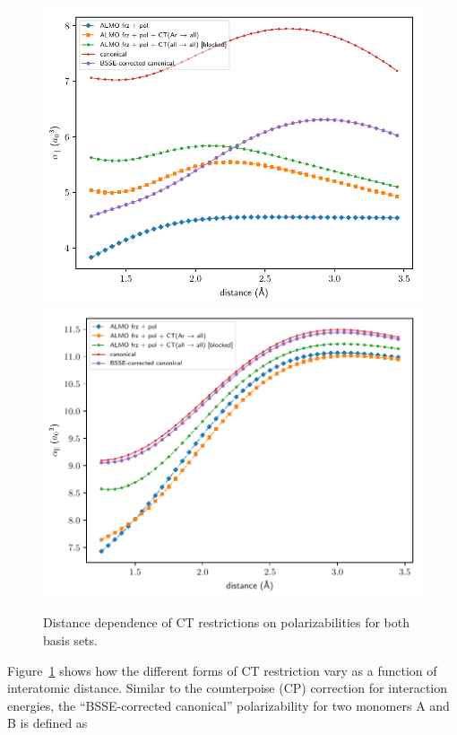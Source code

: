 \begin{figure}
  \includegraphics[scale=1.00]{paper_04/almo_vs_bsse_canonical_onaxis_projected_short_def2-SVP.pdf}
  \includegraphics[scale=1.00]{paper_04/almo_vs_bsse_canonical_onaxis_projected_short_def2-SVPD.pdf}
  \caption{Distance dependence of CT restrictions on polarizabilities for both basis sets.}
  \label{fig:distance-dependence-ct-levels}
\end{figure}

Figure~\ref{fig:distance-dependence-ct-levels} shows how the different forms of CT restriction vary as a function of interatomic distance. Similar to the counterpoise (CP) correction for interaction energies, the ``BSSE-corrected canonical'' polarizability for two monomers A and B is defined as

